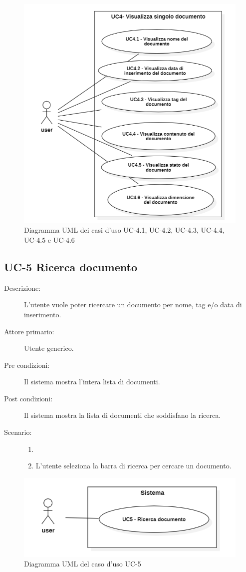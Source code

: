 \begin{figure}[H]
    \centering
    \includegraphics[width=0.8\linewidth]{UC4.1.PNG}
    \caption{Diagramma UML dei casi d'uso UC-4.1, UC-4.2, UC-4.3, UC-4.4, UC-4.5 e UC-4.6}
    \label{fig:UC4.1}
\end{figure}

\subsection{UC-5 Ricerca documento}
\begin{description}
    \item[Descrizione:] L’utente vuole poter ricercare un documento per nome, tag e/o data di inserimento.
    \item[Attore primario:] Utente generico.
    \item[Pre condizioni:] Il sistema mostra l’intera lista di documenti.
    \item[Post condizioni:] Il sistema mostra la lista di documenti che soddisfano la ricerca.
    \item[Scenario:]
    \begin{enumerate}
        \item[]
        \item L’utente seleziona la barra di ricerca per cercare un documento.
    \end{enumerate}
\end{description}

\begin{figure}[H]
    \centering
    \includegraphics[width=0.8\linewidth]{UC5.PNG}
    \caption{Diagramma UML del caso d'uso UC-5}
    \label{fig:UC5}
\end{figure}

